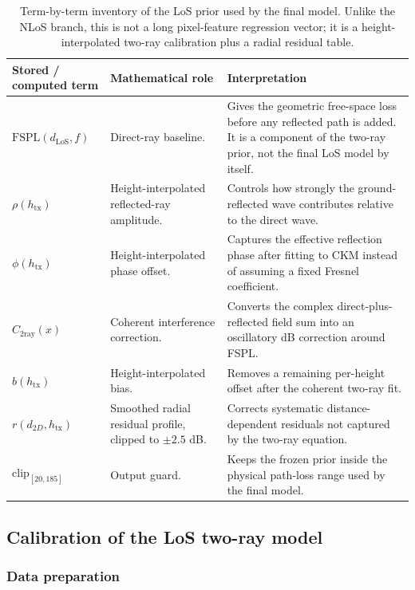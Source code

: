 \begin{table}[H]
\centering
\footnotesize
\setlength{\tabcolsep}{4pt}
\renewcommand{\arraystretch}{1.08}
\begin{tabularx}{\textwidth}{p{3.2cm} X X}
\toprule
\textbf{Stored / computed term} & \textbf{Mathematical role} & \textbf{Interpretation} \\
\midrule
\(\mathrm{FSPL}(d_{\mathrm{LoS}},f)\) & Direct-ray baseline. & Gives the geometric free-space loss before any reflected path is added. It is a component of the two-ray prior, not the final LoS model by itself. \\
\(\rho(h_{\mathrm{tx}})\) & Height-interpolated reflected-ray amplitude. & Controls how strongly the ground-reflected wave contributes relative to the direct wave. \\
\(\phi(h_{\mathrm{tx}})\) & Height-interpolated phase offset. & Captures the effective reflection phase after fitting to CKM instead of assuming a fixed Fresnel coefficient. \\
\(C_{\mathrm{2ray}}(x)\) & Coherent interference correction. & Converts the complex direct-plus-reflected field sum into an oscillatory dB correction around FSPL. \\
\(b(h_{\mathrm{tx}})\) & Height-interpolated bias. & Removes a remaining per-height offset after the coherent two-ray fit. \\
\(r(d_{2D},h_{\mathrm{tx}})\) & Smoothed radial residual profile, clipped to \(\pm2.5\) dB. & Corrects systematic distance-dependent residuals not captured by the two-ray equation. \\
\(\mathrm{clip}_{[20,185]}\) & Output guard. & Keeps the frozen prior inside the physical path-loss range used by the final model. \\
\bottomrule
\end{tabularx}
\caption{Term-by-term inventory of the LoS prior used by
the final model. Unlike the NLoS branch, this is not a long pixel-feature
regression vector; it is a height-interpolated two-ray calibration plus a
radial residual table.}
\label{tab:x78_los_inventory}
\end{table}

\subsection{Calibration of the LoS two-ray model}
\label{sec:los_calibration}

\subsubsection{Data preparation}

